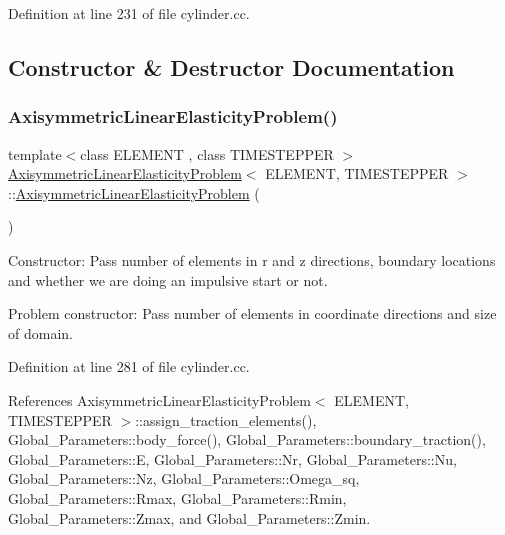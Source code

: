 Definition at line 231 of file cylinder.\+cc.



\subsection{Constructor \& Destructor Documentation}
\mbox{\label{classAxisymmetricLinearElasticityProblem_aaa4da18227b8b20dfba1f67bad4907ed}} 
\subsubsection{\texorpdfstring{Axisymmetric\+Linear\+Elasticity\+Problem()}{AxisymmetricLinearElasticityProblem()}}
{\footnotesize\ttfamily template$<$class E\+L\+E\+M\+E\+NT , class T\+I\+M\+E\+S\+T\+E\+P\+P\+ER $>$ \\
\hyperlink{classAxisymmetricLinearElasticityProblem}{Axisymmetric\+Linear\+Elasticity\+Problem}$<$ E\+L\+E\+M\+E\+NT, T\+I\+M\+E\+S\+T\+E\+P\+P\+ER $>$\+::\hyperlink{classAxisymmetricLinearElasticityProblem}{Axisymmetric\+Linear\+Elasticity\+Problem} (\begin{DoxyParamCaption}{ }\end{DoxyParamCaption})}



Constructor\+: Pass number of elements in r and z directions, boundary locations and whether we are doing an impulsive start or not. 

Problem constructor\+: Pass number of elements in coordinate directions and size of domain. 

Definition at line 281 of file cylinder.\+cc.



References Axisymmetric\+Linear\+Elasticity\+Problem$<$ E\+L\+E\+M\+E\+N\+T, T\+I\+M\+E\+S\+T\+E\+P\+P\+E\+R $>$\+::assign\+\_\+traction\+\_\+elements(), Global\+\_\+\+Parameters\+::body\+\_\+force(), Global\+\_\+\+Parameters\+::boundary\+\_\+traction(), Global\+\_\+\+Parameters\+::E, Global\+\_\+\+Parameters\+::\+Nr, Global\+\_\+\+Parameters\+::\+Nu, Global\+\_\+\+Parameters\+::\+Nz, Global\+\_\+\+Parameters\+::\+Omega\+\_\+sq, Global\+\_\+\+Parameters\+::\+Rmax, Global\+\_\+\+Parameters\+::\+Rmin, Global\+\_\+\+Parameters\+::\+Zmax, and Global\+\_\+\+Parameters\+::\+Zmin.



